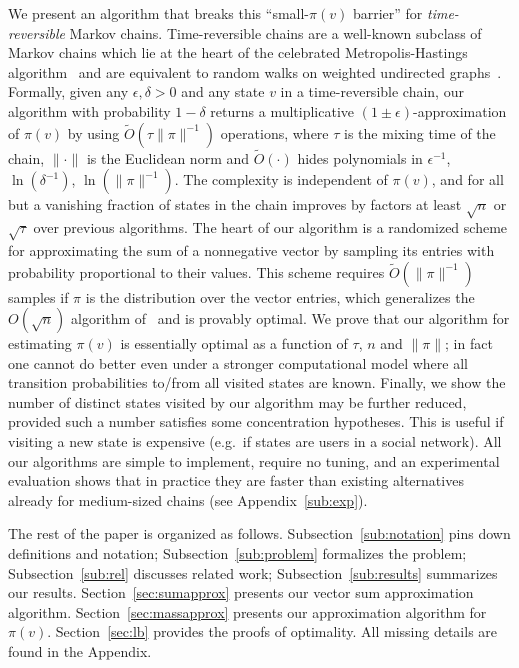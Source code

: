 \documentclass[a4paper,11pt]{article}
\begin{document}
We present an algorithm that breaks this ``small-$\pi(v)$ barrier'' for \emph{time-reversible} Markov chains. Time-reversible chains are a well-known subclass of Markov chains which lie at the heart of the celebrated Metropolis-Hastings algorithm~\cite{Hastings1970} and are equivalent to random walks on weighted undirected graphs~\cite{Levin&2006}.
Formally, given any $\epsilon,\delta>0$ and any state $v$ in a time-reversible chain, our algorithm with probability $1-\delta$ returns a multiplicative $(1\pm\epsilon)$-approximation of $\pi(v)$ by using $\tilde{O}(\tau \|\pi\|^{-1} )$ operations, where $\tau$ is the mixing time of the chain, $\|\cdot\|$ is the Euclidean norm and $\tilde{O}(\cdot)$ hides polynomials in $\epsilon^{-1}$, $\ln{\!(\delta^{-1})}$, $\ln{\!(\|\pi\|^{-1})}$.
The complexity is independent of $\pi(v)$, and for all but a vanishing fraction of states in the chain improves by factors at least $\sqrt{n}$ or $\sqrt{\tau}$ over previous algorithms.
The heart of our algorithm is a randomized scheme for approximating the sum of a nonnegative vector by sampling its entries with probability proportional to their values.
This scheme requires $\tilde{O}(\|\pi\|^{-1})$ samples if $\pi$ is the distribution over the vector entries, which generalizes the $O(\sqrt{n})$ algorithm of~\cite{Motwani&2007} and is provably optimal.
We prove that our algorithm for estimating $\pi(v)$ is essentially optimal as a function of $\tau$, $n$ and $\|\pi\|$; in fact one cannot do better even under a stronger computational model where all transition probabilities to/from all visited states are known.
Finally, we show the number of distinct states visited by our algorithm may be further reduced, provided such a number satisfies some concentration hypotheses.
This is useful if visiting a new state is expensive (e.g.\ if states are users in a social network).
All our algorithms are simple to implement, require no tuning, and an experimental evaluation shows that in practice they are faster than existing alternatives already for medium-sized chains (see Appendix~\ref{sub:exp}).

The rest of the paper is organized as follows.
Subsection~\ref{sub:notation} pins down definitions and notation; Subsection~\ref{sub:problem} formalizes the problem; Subsection~\ref{sub:rel} discusses related work; Subsection~\ref{sub:results} summarizes our results.
Section~\ref{sec:sumapprox} presents our vector sum approximation algorithm.
Section~\ref{sec:massapprox} presents our approximation algorithm for $\pi(v)$.
Section~\ref{sec:lb} provides the proofs of optimality.
All missing details are found in the Appendix.
\end{document}
